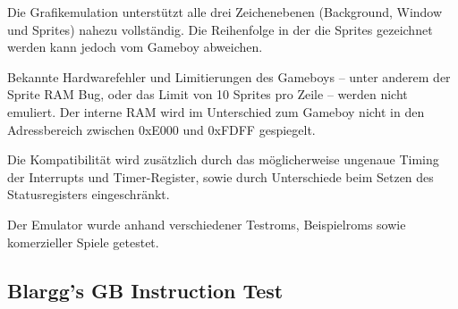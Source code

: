 \documentclass[a4paper]{scrartcl}
\begin{document}
Die Grafikemulation unterstützt alle drei Zeichenebenen (Background, Window und Sprites) nahezu vollständig. Die Reihenfolge in der die Sprites gezeichnet werden kann jedoch vom Gameboy abweichen.

Bekannte Hardwarefehler und Limitierungen des Gameboys -- unter anderem der Sprite RAM Bug, oder das Limit von 10 Sprites pro Zeile -- werden nicht emuliert. Der interne RAM wird im Unterschied zum Gameboy nicht in den Adressbereich zwischen 0xE000 und 0xFDFF gespiegelt.

Die Kompatibilität wird zusätzlich durch das möglicherweise ungenaue Timing der Interrupts und Timer-Register, sowie durch Unterschiede beim Setzen des Statusregisters eingeschränkt.

Der Emulator wurde anhand verschiedener Testroms, Beispielroms sowie komerzieller Spiele getestet.

\subsection{Blargg's GB Instruction Test}
\end{document}
